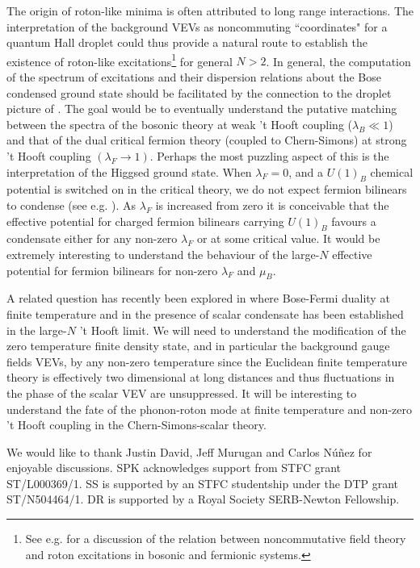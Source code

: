 The  origin of roton-like minima is often attributed to long range interactions. The interpretation of the background VEVs as noncommuting ``coordinates" for a quantum Hall droplet could thus provide a natural route to establish the existence of roton-like excitations\footnote{See e.g. \cite{Castorina:2004yd} for a discussion of the relation between noncommutative field theory and roton excitations in bosonic and fermionic systems.} for general $N>2$.  In general, the computation of the spectrum of excitations and their dispersion relations about the Bose condensed ground state should be facilitated by the connection to the droplet picture of \cite{Polychronakos:2001mi}. The goal would be to eventually understand the putative matching between the  spectra of the bosonic theory at weak 't Hooft coupling ($\lambda_B\ll 1$) and that of the dual critical fermion theory (coupled to Chern-Simons) at strong 't Hooft coupling $(\lambda_F\to 1)$. Perhaps the most puzzling aspect of this is the interpretation of the Higgsed ground state. When $\lambda_F=0$, and a $U(1)_B$ chemical potential is switched on in the critical theory, we do not  expect fermion bilinears to condense (see e.g. \cite{Hands:1998he}). As $\lambda_F$ is increased from zero it is conceivable that the effective potential for charged fermion bilinears carrying $U(1)_B$ favours a condensate either for any non-zero $\lambda_F$ or at some critical value. It would be extremely interesting to understand the behaviour of the large-$N$ effective potential for fermion bilinears for non-zero $\lambda_F$ and $\mu_B$.



 A related question has recently been explored in \cite{Choudhury:2018iwf} where Bose-Fermi duality at finite temperature and in the presence of scalar condensate has been established in the large-$N$ 't Hooft limit. We will need to understand  the modification of the zero temperature finite density state, and in particular the background gauge fields VEVs, by any non-zero temperature since the  Euclidean finite temperature theory is effectively two dimensional at long distances and thus fluctuations in the  phase of the scalar VEV are unsuppressed.  It will be interesting to understand the fate of the phonon-roton mode at finite temperature and non-zero 't Hooft coupling in the Chern-Simons-scalar theory.


\acknowledgments We would like to thank Justin David, Jeff Murugan and Carlos N\'u\~nez for  enjoyable discussions.
SPK acknowledges support from STFC grant ST/L000369/1. SS is supported by an STFC studentship under the DTP grant ST/N504464/1. DR is supported by a Royal Society SERB-Newton Fellowship.
\newpage


